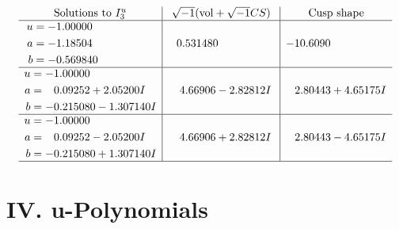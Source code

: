 \documentclass[1p]{elsarticle_modified}
\theoremstyle{definition}
\newcommand{\I}{\sqrt{-1}}
\begin{document}
$$\begin{array}{c|c|c}  
\text{Solutions to }I^u_{3}& \I (\text{vol} + \sqrt{-1}CS) & \text{Cusp shape}\\
 \hline 
\begin{aligned}
u &= -1.00000\phantom{ +0.000000I} \\
a &= -1.18504\phantom{ +0.000000I} \\
b &= -0.569840\phantom{ +0.000000I}\end{aligned}
 & \phantom{-}0.531480\phantom{ +0.000000I} & -10.6090\phantom{ +0.000000I} \\ \hline\begin{aligned}
u &= -1.00000\phantom{ +0.000000I} \\
a &= \phantom{-}0.09252 + 2.05200 I \\
b &= -0.215080 - 1.307140 I\end{aligned}
 & \phantom{-}4.66906 - 2.82812 I & \phantom{-}2.80443 + 4.65175 I \\ \hline\begin{aligned}
u &= -1.00000\phantom{ +0.000000I} \\
a &= \phantom{-}0.09252 - 2.05200 I \\
b &= -0.215080 + 1.307140 I\end{aligned}
 & \phantom{-}4.66906 + 2.82812 I & \phantom{-}2.80443 - 4.65175 I\\
 \hline 
 \end{array}$$\newpage
\newpage\renewcommand{\arraystretch}{1}
\centering \section*{ IV. u-Polynomials}
\end{document}
